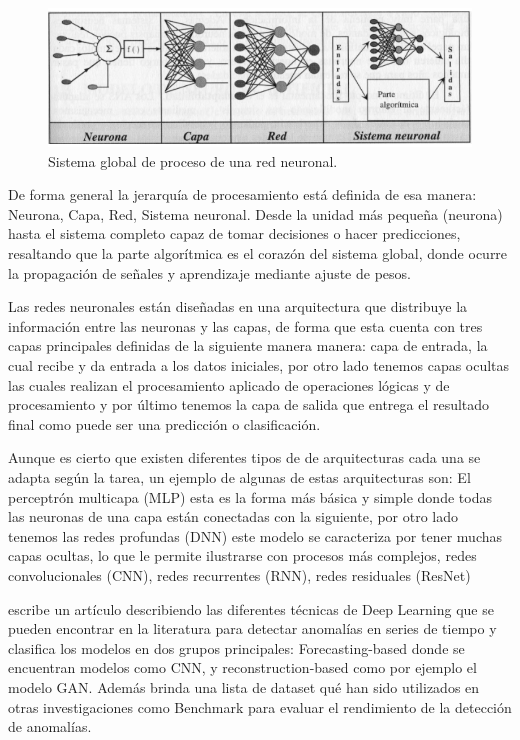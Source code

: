 \documentclass[11pt,a4paper,spanish]{book}
\numberwithin{equation}{chapter}
\numberwithin{figure}{chapter}
\begin{document}
\begin{figure}[h]
    \centering
    \includegraphics[width=1.0\textwidth]{media/sistema-neuronal.png}
    \caption{Sistema global de proceso de una red neuronal.  \protect\cite{larranaga2021redes} }
    \label{fig:figSistemaNeuronal}
\end{figure}



De forma general la jerarquía de procesamiento está definida de esa manera: Neurona, Capa, 
Red, Sistema neuronal. Desde la unidad más pequeña (neurona) hasta el sistema completo 
capaz de tomar decisiones o hacer predicciones, resaltando que la parte algorítmica es 
el corazón del sistema global, donde ocurre la propagación de señales y aprendizaje 
mediante ajuste de pesos. \cite{larranaga2021redes}


Las redes neuronales están diseñadas en una arquitectura que distribuye la información 
entre las neuronas y las capas, de forma que esta cuenta con tres capas principales 
definidas de la siguiente manera manera: capa de entrada, la cual recibe y da entrada a 
los datos iniciales, por otro lado tenemos capas ocultas las cuales realizan el 
procesamiento aplicado de operaciones lógicas y de procesamiento y por último tenemos 
la capa de salida que entrega el resultado final como puede ser una predicción o 
clasificación. \cite{larranaga2021redes} 


Aunque es cierto que existen diferentes tipos de de arquitecturas cada una se adapta 
según la tarea, un ejemplo de algunas de estas arquitecturas son: 
El perceptrón multicapa (MLP) esta es la forma más básica y simple donde todas las 
neuronas de una capa están conectadas con la siguiente, por otro lado tenemos las redes 
profundas (DNN) este modelo se caracteriza por tener muchas capas ocultas, lo que le 
permite ilustrarse con procesos más complejos, redes convolucionales (CNN), redes 
recurrentes (RNN), redes residuales (ResNet)


\cite{Zamanzadeh_Darban_2024} escribe un artículo describiendo las diferentes técnicas 
de Deep Learning que se pueden encontrar en la literatura para detectar anomalías en 
series de tiempo y clasifica los modelos en dos grupos principales: 
Forecasting-based donde se encuentran modelos como CNN, y reconstruction-based 
como por ejemplo el modelo GAN. Además brinda una lista de dataset qué han sido 
utilizados en otras investigaciones como Benchmark para evaluar el rendimiento de la 
detección de anomalías.
\end{document}
